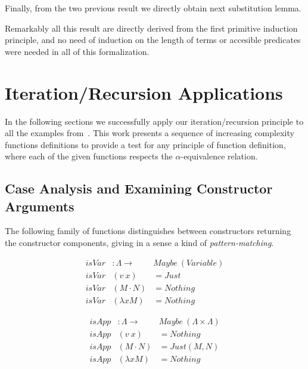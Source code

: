 \documentclass{article}
\newcommand{\alp}{\ensuremath{\alpha}}
\begin{document}
Finally, from the two previous result we directly obtain next substitution lemma.

 \hspace{5px}

Remarkably all this result are directly derived from the first primitive induction principle, and no need of induction on the length of terms or accesible predicates were needed in all of this formalization.

\appendix

\section{Iteration/Recursion Applications}
\label{sec:applications}

In the following sections we successfully apply our iteration/recursion principle to all the examples from~\cite{Norrish04recursivefunction}. This work presents a sequence of increasing complexity functions definitions to provide a test for any principle of function definition, where each of the given functions respects the \alp-equivalence relation.

\subsection{Case Analysis and Examining Constructor Arguments}
\label{sec:caseanalysis}

The following family of functions distinguishes between constructors returning the constructor components, giving in a sense a kind of \emph{pattern-matching}.

\begin{minipage}{.5\textwidth}
\[\begin{array}{rll}
isVar &: \Lambda \rightarrow& Maybe\ ( Variable ) \\
isVar &(v\ x)         &= Just \\
isVar &(M \cdot N)   &= Nothing \\
isVar &(\lambda x M) &= Nothing
\end{array}\]
\end{minipage}
\begin{minipage}{.5\textwidth}
\[\begin{array}{rll}
isApp &: \Lambda \rightarrow& Maybe\ (\Lambda \times \Lambda) \\
isApp &(v\ x)          &= Nothing \\
isApp &(M \cdot N)   &= Just (M , N) \\
isApp &(\lambda x M) &= Nothing
\end{array}\]
\end{minipage}
\end{document}
